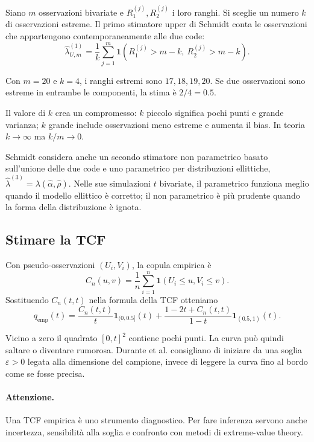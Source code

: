 \documentclass[11pt,a4paper]{article}
\newcommand{\ind}{\mathbf{1}}
\newcommand{\Attenzione}{\paragraph{Attenzione.}}
\begin{document}
Siano $m$ osservazioni bivariate e $R_1^{(j)},R_2^{(j)}$ i loro ranghi. Si
sceglie un numero $k$ di osservazioni estreme. Il primo stimatore upper di
Schmidt conta le osservazioni che appartengono contemporaneamente alle due
code:
\begin{equation}
 \widehat\lambda_{U,m}^{(1)}=\frac{1}{k}\sum_{j=1}^m
 \ind\!\left(R_1^{(j)}>m-k,\ R_2^{(j)}>m-k\right).
 \label{eq:tdc-estimator}
\end{equation}

Con $m=20$ e $k=4$, i ranghi estremi sono $17,18,19,20$. Se due osservazioni
sono estreme in entrambe le componenti, la stima è $2/4=0.5$.

Il valore di $k$ crea un compromesso: $k$ piccolo significa pochi punti e
grande varianza; $k$ grande include osservazioni meno estreme e aumenta il
bias. In teoria $k\to\infty$ ma $k/m\to0$.

Schmidt considera anche un secondo stimatore non parametrico basato
sull'unione delle due code e uno parametrico per distribuzioni ellittiche,
$\widehat\lambda^{(3)}=\lambda(\widehat\alpha,\widehat\rho)$. Nelle sue
simulazioni $t$ bivariate, il parametrico funziona meglio quando il modello
ellittico è corretto; il non parametrico è più prudente quando la forma della
distribuzione è ignota.

\subsection{Stimare la TCF}

Con pseudo-osservazioni $(U_i,V_i)$, la copula empirica è
\begin{equation}
 C_n(u,v)=\frac1n\sum_{i=1}^n
 \ind\!\left(U_i\leq u,V_i\leq v\right).
 \label{eq:empirical-copula}
\end{equation}
Sostituendo $C_n(t,t)$ nella formula della TCF otteniamo
\begin{equation}
 q_{\mathrm{emp}}(t)=
 \frac{C_n(t,t)}{t}\ind_{(0,0.5]}(t)+
 \frac{1-2t+C_n(t,t)}{1-t}\ind_{(0.5,1)}(t).
 \label{eq:empirical-tcf}
\end{equation}

Vicino a zero il quadrato $[0,t]^2$ contiene pochi punti. La curva può quindi
saltare o diventare rumorosa. Durante et al. consigliano di iniziare da una
soglia $\varepsilon>0$ legata alla dimensione del campione, invece di leggere
la curva fino al bordo come se fosse precisa.

\Attenzione Una TCF empirica è uno strumento diagnostico. Per fare inferenza
servono anche incertezza, sensibilità alla soglia e confronto con metodi di
extreme-value theory.
\end{document}

